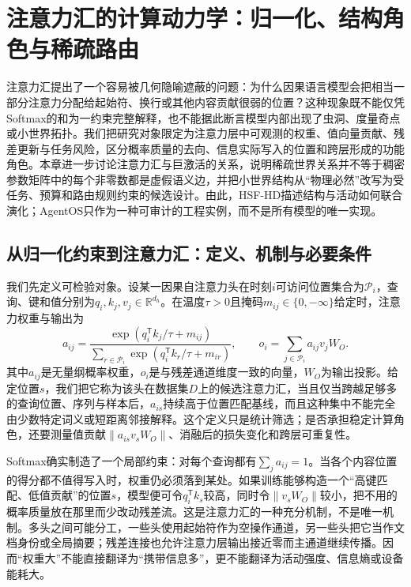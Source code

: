 \chapter{注意力汇的计算动力学：归一化、结构角色与稀疏路由}
\label{chp:topology_of_attention_sink}

注意力汇提出了一个容易被几何隐喻遮蔽的问题：为什么因果语言模型会把相当一部分注意力分配给起始符、换行或其他内容贡献很弱的位置？这种现象既不能仅凭Softmax的和为一约束完整解释，也不能据此断言模型内部出现了虫洞、度量奇点或小世界拓扑。我们把研究对象限定为注意力层中可观测的权重、值向量贡献、残差更新与任务风险，区分概率质量的去向、信息实际写入的位置和跨层形成的功能角色。本章进一步讨论注意力汇与巨激活的关系，说明稀疏世界关系并不等于稠密参数矩阵中的每个非零数都是虚假语义边，并把小世界结构从“物理必然”改写为受任务、预算和路由规则约束的候选设计。由此，HSF-HD描述结构与活动如何联合演化；AgentOS只作为一种可审计的工程实例，而不是所有模型的唯一实现。

\section{从归一化约束到注意力汇：定义、机制与必要条件}
\label{sec:softmax_surface_tension}

我们先定义可检验对象。设某一因果自注意力头在时刻$i$可访问位置集合为$\mathcal{P}_i$，查询、键和值分别为$q_i,k_j,v_j\in\mathbb{R}^{d_h}$。在温度$\tau>0$且掩码$m_{ij}\in\{0,-\infty\}$给定时，注意力权重与输出为
\begin{equation}
 a_{ij}=\frac{\exp(q_i^{\mathsf T}k_j/\tau+m_{ij})}
 {\sum_{r\in\mathcal{P}_i}\exp(q_i^{\mathsf T}k_r/\tau+m_{ir})},
 \qquad
 o_i=\sum_{j\in\mathcal{P}_i}a_{ij}v_jW_O.
\end{equation}
其中$a_{ij}$是无量纲概率权重，$o_i$是与残差通道维度一致的向量，$W_O$为输出投影。给定位置$s$，我们把它称为该头在数据集$D$上的候选注意力汇，当且仅当跨越足够多的查询位置、序列与样本后，$a_{is}$持续高于位置匹配基线，而且这种集中不能完全由少数特定词义或短距离邻接解释。这个定义只是统计筛选；是否承担稳定计算角色，还要测量值贡献$\|a_{is}v_sW_O\|$、消融后的损失变化和跨层可重复性。

Softmax确实制造了一个局部约束：对每个查询都有$\sum_j a_{ij}=1$。当各个内容位置的得分都不值得写入时，权重仍必须落到某处。如果训练能够构造一个“高键匹配、低值贡献”的位置$s$，模型便可令$q_i^{\mathsf T}k_s$较高，同时令$\|v_sW_O\|$较小，把不用的概率质量放在那里而少改动残差流。这是注意力汇的一种充分机制，不是唯一机制。多头之间可能分工，一些头使用起始符作为空操作通道，另一些头把它当作文档身份或全局摘要；残差连接也允许注意力层输出接近零而主通道继续传播。因而“权重大”不能直接翻译为“携带信息多”，更不能翻译为活动强度、信息熵或设备能耗大。

